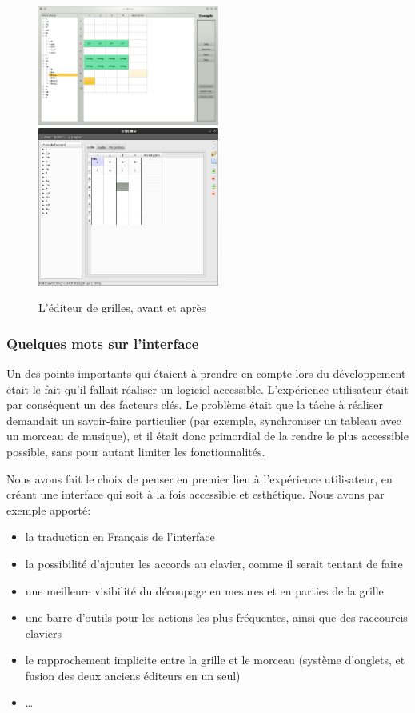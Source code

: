 \documentclass[a4paper,11pt]{article}
\begin{document}
\begin{figure}[H]
\begin{center}
\includegraphics[width=225px]{ancien_editeur.png}
\includegraphics[width=225px]{nouveau_editeur.png}
\caption{L'éditeur de grilles, avant et après}
\label{av_ap_editeur}
\end{center}
\end{figure}


\subsubsection*{Quelques mots sur l'interface}

Un des points importants qui étaient à prendre en compte lors du développement était le fait qu'il fallait réaliser un logiciel accessible. L'expérience utilisateur était par conséquent un des facteurs clés. Le problème était que la tâche à réaliser demandait un savoir-faire particulier (par exemple, synchroniser un tableau avec un morceau de musique), et il était donc primordial de la rendre le plus accessible possible, sans pour autant limiter les fonctionnalités.

Nous avons fait le choix de penser en premier lieu à l'expérience utilisateur, en créant une interface qui soit à la fois accessible et esthétique. Nous avons par exemple apporté:
\begin{itemize}
 \item la traduction en Français de l'interface
 \item la possibilité d'ajouter les accords au clavier, comme il serait tentant de faire
 \item une meilleure visibilité du découpage en mesures et en parties de la grille
 \item une barre d'outils pour les actions les plus fréquentes, ainsi que des raccourcis claviers
 \item le rapprochement implicite entre la grille et le morceau (système d'onglets, et fusion des deux anciens éditeurs en un seul)
 \item \dots
\end{itemize}
\end{document}
